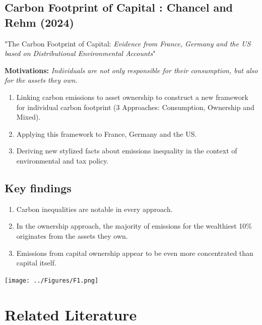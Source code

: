 \documentclass[10pt]{beamer}
\begin{document}
\subsection{Carbon Footprint of Capital : Chancel and Rehm (2024)}
\begin{frame}{\subsecname}
    \begin{center}
    "The Carbon Footprint of Capital: 
    \textit{Evidence from France, Germany and the US based on Distributional Environmental Accounts}"
    \end{center}

    \textbf{Motivations:}
    \textit{Individuals are not only responsible for their consumption, but also for the assets they own.}
    \begin{enumerate}
        \item Linking carbon emissions to asset ownership to construct a new framework for individual carbon footprint (3 Approaches: Consumption, Ownership and Mixed).
        \item Applying this framework to France, Germany and the US.
        \item Deriving new stylized facts about emissions inequality in the context of environmental and tax policy.
    \end{enumerate}
\end{frame}

\subsection{Key findings}
\begin{frame}{\subsecname}
    \begin{enumerate}
        \item Carbon inequalities are notable in every approach.
        \item In the ownership approach, the majority of emissions for the wealthiest 10\% originates from the assets they own.
        \item Emissions from capital ownership appear to be even more concentrated than capital itself.
    \end{enumerate}
    \texttt{[image: ../Figures/F1.png]}
\end{frame}

\section{Related Literature}
\begin{frame}
    \tableofcontents[currentsection, hideothersubsections, sections=\value{section}]
\end{frame}
\end{document}

